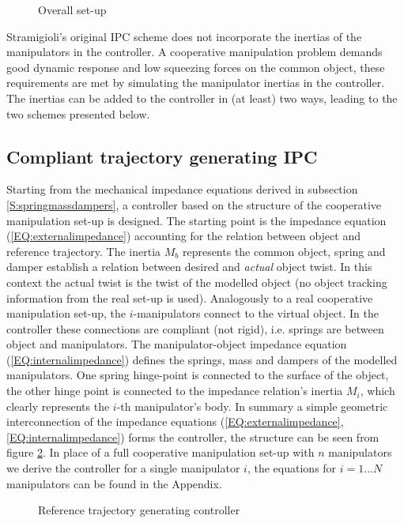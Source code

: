 \documentclass[a4paper,twoside, openright,12pt]{report}
\begin{document}
\begin{figure}[b!]
	\centering
	\small
	\def\svgwidth{0.99\columnwidth}
	
	\caption{Overall set-up}
	\label{FIG:modelbasedcontrol}
\end{figure}
Stramigioli's original IPC scheme \cite{Stramigioli_01} does not incorporate the inertias of the manipulators in the controller. A cooperative manipulation problem demands good dynamic response and low squeezing forces on the common object, these requirements are met by simulating the manipulator inertias in the controller. The inertias can be added to the controller in (at least) two ways, leading to the two schemes presented below.   

\subsection{Compliant trajectory generating IPC}\label{SS:referencetrajectoryDIPC}
Starting from the mechanical impedance equations derived in subsection \ref{S:springmassdampers}, a controller based on the structure of the cooperative manipulation set-up is designed. The starting point is the impedance equation (\ref{EQ:externalimpedance}) accounting for the relation between object and reference trajectory. The inertia $M_b$ represents the common object, spring and damper establish a relation between desired and \emph{actual} object twist. In this context the actual twist is the twist of the modelled object (no object tracking information from the real set-up is used). Analogously to a real cooperative manipulation set-up, the $i$-manipulators connect to the virtual object. In the controller these connections are compliant (not rigid), i.e. springs are between object and manipulators. The manipulator-object impedance equation (\ref{EQ:internalimpedance}) defines the springs, mass and dampers of the modelled manipulators. One spring hinge-point is connected to the surface of the object, the other hinge point is connected to the impedance relation's inertia  $M_i$, which clearly represents the $i$-th manipulator's body. In summary a simple geometric interconnection of the impedance equations (\ref{EQ:externalimpedance},\ref{EQ:internalimpedance}) forms the controller, the structure can be seen from figure \ref{FIG:referencetrajectory}. In place of a full cooperative manipulation set-up with $n$ manipulators we derive the controller for a single manipulator $i$, the equations for $i=1...N$ manipulators can be found in the Appendix.
\begin{figure}[b!]
	\centering
	\small
	\def\svgwidth{0.8\columnwidth}
	
	\caption{Reference trajectory generating controller}
	\label{FIG:referencetrajectory}
\end{figure}
\end{document}
